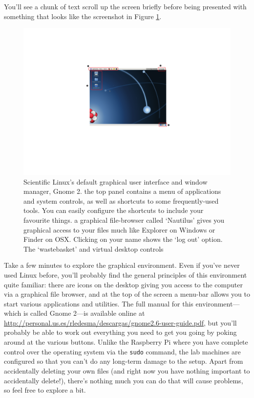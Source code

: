 You'll see a chunk of text scroll up the screen briefly before being presented with something that looks like the screenshot in Figure \ref{figure:gnome-desktop}.

\begin{figure}[t]
\centerline{\includegraphics[width=16cm]{images/gnome-desktop}}
\caption{Scientific Linux's default graphical user interface and
  window manager, Gnome 2. \protect{} the top panel contains
  a menu of applications and system controls, as well as shortcuts to
  some frequently-used tools. You can easily configure the shortcuts
  to include your favourite things. \protect{} a graphical
  file-browser called `Nautilus' gives you graphical access to your
  files much like Explorer on Windows or Finder on
  OSX. \protect{} Clicking on your name shows the `log out'
  option. \protect{} The `wastebasket' and virtual desktop
  controls}\label{figure:gnome-desktop}
\end{figure}

Take a few minutes to explore the graphical environment. Even if you've never used Linux before, you'll probably find the general principles of this environment quite familiar: there are icons on the desktop giving you access to the computer via a graphical file browser, and at the top of the screen a menu-bar allows you to start various applications and utilities. The full manual for this environment---which is called Gnome 2---is available online at \url{http://personal.us.es/rledesma/descargas/gnome2.6-user-guide.pdf}, but you'll probably be able to work out everything you need to get you going by poking around at the various buttons. Unlike the Raspberry Pi where you have complete control over the operating system via the \texttt{sudo} command, the lab machines are configured so that you can't do any long-term damage to the setup. Apart from accidentally deleting your own files (and right now you have nothing important to accidentally delete!), there's nothing much you can do that will cause problems, so feel free to explore a bit. 

